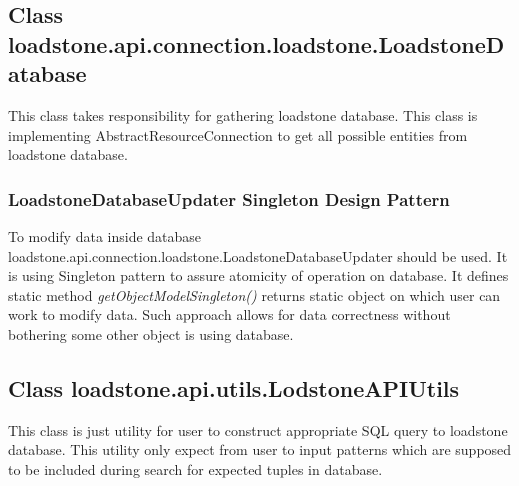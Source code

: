 \subsection{Class loadstone.api.connection.loadstone.LoadstoneDatabase}
This class takes responsibility for gathering loadstone database. This class is implementing AbstractResourceConnection to get all possible entities from loadstone database. 
\subsubsection{LoadstoneDatabaseUpdater Singleton Design Pattern}
To modify data inside database loadstone.api.connection.loadstone.LoadstoneDatabaseUpdater should be used. It is using Singleton pattern to assure atomicity of operation on database. It defines static method \textit{getObjectModelSingleton()} returns static object on which user can work to modify data. Such approach allows for data correctness without bothering some other object is using database.  

\subsection{Class loadstone.api.utils.LodstoneAPIUtils}
This class is just utility for user to construct appropriate SQL query to loadstone database. This utility only expect from user to input patterns which are supposed to be included during search for expected tuples in database. 
